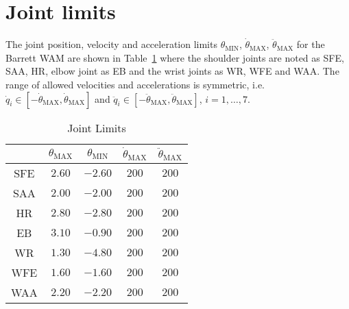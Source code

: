 \section*{Joint limits}

The joint position, velocity and acceleration limits $\theta_{\mathrm{MIN}}$, $\dot{\theta}_{\mathrm{MAX}}$, $\ddot{\theta}_{\mathrm{MAX}}$ for the Barrett WAM are shown in Table~\ref{joint limits} where the shoulder joints are noted as SFE, SAA, HR, elbow joint as EB and the wrist joints as WR, WFE and WAA. The range of allowed velocities and accelerations is symmetric, i.e. $\dot{q}_i \in [-\dot{\theta}_{\mathrm{MAX}},\dot{\theta}_{\mathrm{MAX}}]$ and $\ddot{q}_i \in [-\ddot{\theta}_{\mathrm{MAX}},\ddot{\theta}_{\mathrm{MAX}}]$, $i = 1, \ldots, 7$.

\begin{table}
\renewcommand{\arraystretch}{1.3}
\caption{Joint Limits}
\label{joint limits}
\centering
\begin{tabular}{c|c|c|c|c}
& \bfseries $\theta_{\mathrm{MAX}}$ & $\theta_{\mathrm{MIN}}$ & \bfseries $\dot{\theta}_{\mathrm{MAX}}$ & \bfseries $\ddot{\theta}_{\mathrm{MAX}}$ \\
\hline
SFE & $2.60$ & $-2.60$ & $200$ & $200$ \\
\hline
SAA & $2.00$ & $-2.00$ & $200$ & $200$ \\
\hline
HR & $2.80$ & $-2.80$ & $200$ & $200$ \\
\hline
EB & $3.10$ & $-0.90$ & $200$ & $200$ \\
\hline
WR & $1.30$ & $-4.80$ & $200$ & $200$ \\
\hline
WFE & $1.60$ & $-1.60$ & $200$ & $200$ \\
\hline
WAA & $2.20$ & $-2.20$ & $200$ & $200$
\end{tabular}
\end{table}

